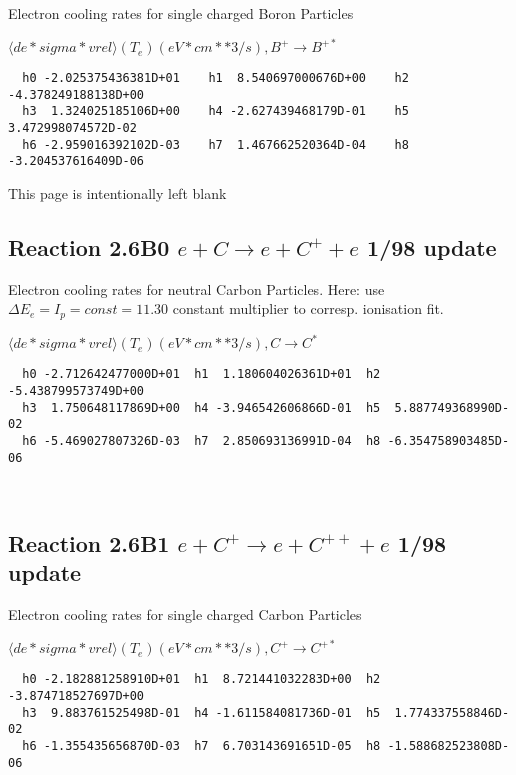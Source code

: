\documentclass[12pt,dvipdfmx]{article}
\begin{document}
{ Electron cooling rates for single
 charged Boron Particles

 $ \langle de*sigma*vrel \rangle(T_e)  (eV*cm**3/s), B^+ \rightarrow B^{+*} $


\begin{small}\begin{verbatim}
  h0 -2.025375436381D+01    h1  8.540697000676D+00    h2 -4.378249188138D+00
  h3  1.324025185106D+00    h4 -2.627439468179D-01    h5  3.472998074572D-02
  h6 -2.959016392102D-03    h7  1.467662520364D-04    h8 -3.204537616409D-06
\end{verbatim}\end{small}

\newpage
This page is intentionally left blank
\newpage

\subsection{
Reaction 2.6B0 $e + C \rightarrow e + C^+ + e  $ 1/98 update
}

 Electron cooling rates for neutral
 Carbon Particles. Here: use $\Delta E_e = I_p = const = 11.30$
 constant multiplier to corresp. ionisation fit.

$  \langle de*sigma*vrel \rangle(T_e)  (eV*cm**3/s), C   \rightarrow C^* $


\begin{small}\begin{verbatim}
  h0 -2.712642477000D+01  h1  1.180604026361D+01  h2 -5.438799573749D+00
  h3  1.750648117869D+00  h4 -3.946542606866D-01  h5  5.887749368990D-02
  h6 -5.469027807326D-03  h7  2.850693136991D-04  h8 -6.354758903485D-06



\end{verbatim}\end{small}

\subsection{
Reaction 2.6B1 $e + C^+ \rightarrow e + C^{++} + e  $ 1/98 update
}

 Electron cooling rates for single
 charged Carbon Particles

 $ \langle de*sigma*vrel \rangle(T_e)  (eV*cm**3/s), C^+ \rightarrow C^{+*} $


\begin{small}\begin{verbatim}
  h0 -2.182881258910D+01  h1  8.721441032283D+00  h2 -3.874718527697D+00
  h3  9.883761525498D-01  h4 -1.611584081736D-01  h5  1.774337558846D-02
  h6 -1.355435656870D-03  h7  6.703143691651D-05  h8 -1.588682523808D-06


\end{verbatim}
\end{small}}
\end{document}
